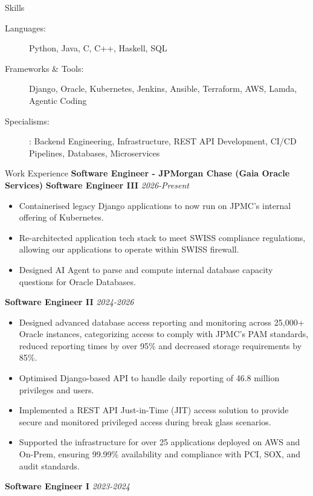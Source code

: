 \documentclass{resume} %
\begin{document}
    \begin{rSection}{Skills}
        \begin{description}
            \item [Languages:] Python, Java, C, C++, Haskell, SQL
            \item [Frameworks \& Tools:] Django, Oracle, Kubernetes, Jenkins, Ansible, Terraform, AWS, Lamda, Agentic Coding
            \item [Specialisms:]: Backend Engineering, Infrastructure, REST API Development, CI/CD Pipelines, Databases, Microservices
        \end{description}
    \end{rSection}
    \begin{rSection}{Work Experience}
    {\bf Software Engineer - JPMorgan Chase (Gaia Oracle Services)}
        \textbf{Software Engineer III}  \hfill {\em 2026-Present}
        \begin{itemize}
            \item Containerised legacy Django applications to now run on JPMC's internal offering of Kubernetes.
            \item Re-architected application tech stack to meet SWISS compliance regulations, allowing our applications to operate within SWISS firewall.
            \item Designed AI Agent to parse and compute internal database capacity questions for Oracle Databases.
        \end{itemize}
        \textbf{Software Engineer II}  \hfill {\em 2024-2026}
        \begin{itemize}
            \item Designed advanced database access reporting and monitoring across 25,000+ Oracle instances, categorizing access to comply with JPMC's PAM standards, reduced reporting times by over 95\% and decreased storage requirements by 85\%.
            \item Optimised Django-based API to handle daily reporting of 46.8 million privileges and users.
            \item Implemented a REST API Just-in-Time (JIT) access solution to provide secure and monitored privileged access during break glass scenarios.
            \item Supported the infrastructure for over 25 applications deployed on AWS and On-Prem, ensuring 99.99\% availability and compliance with PCI, SOX, and audit standards.
        \end{itemize}
        \textbf{Software Engineer I} \hfill {\em 2023-2024}

\end{rSection}
\end{document}
